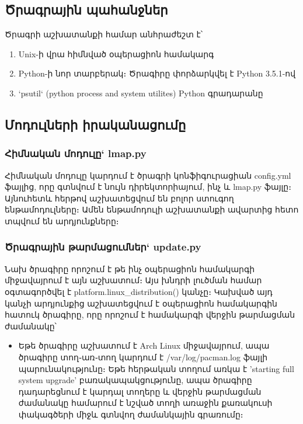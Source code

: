 \documentclass[12pt]{article}
\begin{document}
\begin{sloppypar}
\subsection{Ծրագրային պահանջներ}

Ծրագրի աշխատանքի համար անհրաժեշտ է՝

\begin{enumerate}
\item Unix-ի վրա հիմնված օպերացիոն համակարգ
\item Python-ի նոր տարբերակ։ Ծրագիրը փորձարկվել է Python 3.5.1-ով
\item `psutil` (python process and system utilites) Python գրադարանը
\end{enumerate}

\subsection{Մոդուլների իրականացումը}


\subsubsection{Հիմնական մոդուլը` lmap.py}


Հիմնական մոդուլը կարդում է ծրագրի կոնֆիգուրացիան config.yml ֆայլից,
որը գտնվում է նույն դիրեկտորիայում, ինչ և lmap.py ֆայլը։ Այնուհետև
հերթով աշխատեցվում են բոլոր ստուգող ենթամոդուլները։ Ամեն ենթամոդուլի
աշխատանքի ավարտից հետո տպվում են արդյունքները։


\subsubsection{Ծրագրային թարմացումներ` update.py}


Նախ ծրագիրը որոշում է թե ինչ օպերացիոն համակարգի միջավայրում է այն աշխատում։
Այս խնդրի լուծման համար օգտագործվել է platform.linux\_distribution() կանչը։
Կախված այդ կանչի արդյունքից աշխատեցվում է օպերացիոն համակարգին հատուկ
ծրագիրը, որը որոշում է համակարգի վերջին թարմացման ժամանակը՝

\begin{itemize}
\item Եթե ծրագիրը աշխատում է Arch Linux միջավայրում, ապա ծրագիրը տող֊առ֊տող
    կարդում է /var/log/pacman.log ֆայլի պարունակությունը։ Եթե հերթական տողում առկա է
	'starting full system upgrade' բառակապակցությունը, ապա ծրագիրը դադարեցնում
	է կարդալ տողերը և վերջին թարմացման ժամանակը համարում է նշված տողի առաջին
	քառակուսի փակագծերի միջև գտնվող ժամանկային գրառումը։


\end{itemize}
\end{sloppypar}
\end{document}
